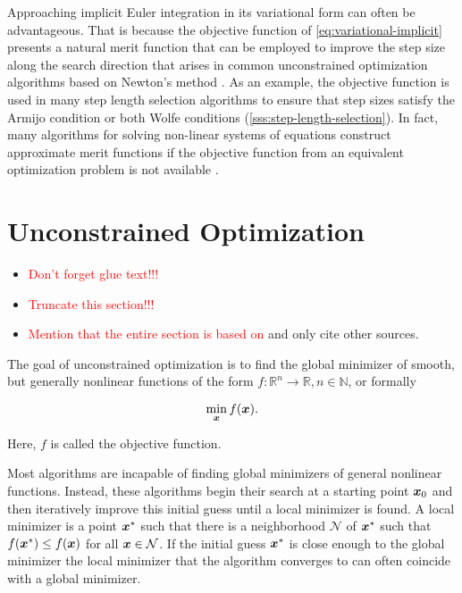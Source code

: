 Approaching implicit Euler integration in its variational form can often be advantageous. That is because the objective function of 
\autoref{eq:variational-implicit} presents a natural merit function that can be employed to improve the step size along the search direction 
that arises in common unconstrained optimization algorithms based on Newton's method \cite{nocedal2006}. As an example, the objective 
function is used in many step length selection algorithms to ensure that step sizes satisfy the Armijo condition or both Wolfe conditions 
(\cref{sss:step-length-selection}). In fact, many algorithms for solving non-linear systems of equations construct approximate merit functions 
if the objective function from an equivalent optimization problem is not available \cite{nocedal2006}.

\section{Unconstrained Optimization}\label{s:unconstrained-optimization}
\begin{itemize}
    \item \textcolor{red}{Don't forget glue text!!!}
    \item \textcolor{red}{Truncate this section!!!}
    \item \textcolor{red}{Mention that the entire section is based on \cite{nocedal2006}} and only cite other sources.
\end{itemize}

The goal of unconstrained optimization is to find the global minimizer of smooth, but generally nonlinear functions of the form $f \colon 
\mathbb{R}^n \to \mathbb{R}, n \in \mathbb{N}$, or formally

\[
    \min_{\bm{x}} f(\bm{x}).
\]

\noindent Here, $f$ is called the objective function. 

Most algorithms are incapable of finding global minimizers of general nonlinear functions. 
Instead, these algorithms begin their search at a starting point $\bm{x}_0$ and then iteratively improve this initial guess until a local 
minimizer is found. A local minimizer is a point $\bm{x}^*$ such that there is a neighborhood $\mathcal{N}$ of 
$\bm{x}^*$ such that $f(\bm{x}^*) \leq f(\bm{x})$ for all $\bm{x} \in \mathcal{N}$. If the initial guess $\bm{x}^*$ is close enough 
to the global minimizer the local minimizer that the algorithm converges to can often coincide with a global minimizer. 

